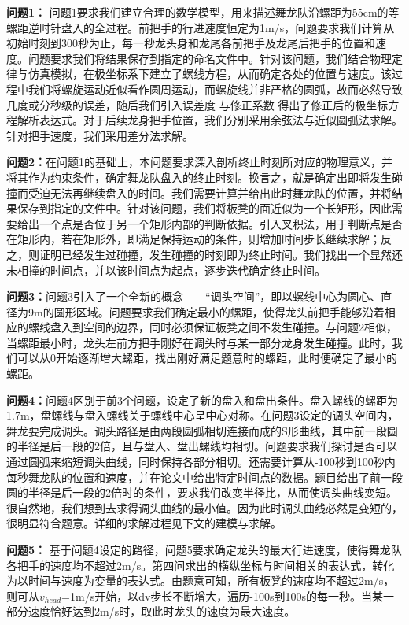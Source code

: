 \documentclass{cumcmthesis1}
\begin{document}
\par 
\textbf{问题1：} 问题1要求我们建立合理的数学模型，用来描述舞龙队沿螺距为55cm的等螺距逆时针盘入的全过程。前把手的行进速度恒定为1m/s，问题要求我们计算从初始时刻到300秒为止，每一秒龙头身和龙尾各前把手及龙尾后把手的位置和速度。问题要求我们将结果保存到指定的命名文件中。针对该问题，我们结合物理定律与仿真模拟，在极坐标系下建立了螺线方程，从而确定各处的位置与速度。该过程中我们将螺旋运动近似看作圆周运动，而螺旋线并非严格的圆弧，故而必然导致几度或分秒级的误差，随后我们引入误差度 \text{$\eta$}与修正系数 \text{$\alpha$}得出了修正后的极坐标方程解析表达式。对于后续龙身把手位置，我们分别采用余弦法与近似圆弧法求解。针对把手速度，我们采用差分法求解。
\par
\textbf{问题2：}在问题1的基础上，本问题要求深入剖析终止时刻所对应的物理意义，并将其作为约束条件，确定舞龙队盘入的终止时刻。换言之，就是确定出即将发生碰撞而受迫无法再继续盘入的时间。我们需要计算并给出此时舞龙队的位置，并将结果保存到指定的文件中。针对该问题，我们将板凳的面近似为一个长矩形，因此需要给出一个点是否位于另一个矩形内部的判断依据。引入叉积法，用于判断点是否在矩形内，若在矩形外，即满足保持运动的条件，则增加时间步长继续求解；反之，则证明已经发生过碰撞，发生碰撞的时刻即为终止时间。我们找出一个显然还未相撞的时间点，并以该时间点为起点，逐步迭代确定终止时间。
\par
\textbf{问题3：}问题3引入了一个全新的概念——“调头空间”，即以螺线中心为圆心、直径为9m的圆形区域。问题要求我们确定最小的螺距，使得龙头前把手能够沿着相应的螺线盘入到空间的边界，同时必须保证板凳之间不发生碰撞。与问题2相似，当螺距最小时，龙头左前方把手刚好在调头时与某一部分龙身发生碰撞。此时，我们可以从0开始逐渐增大螺距，找出刚好满足题意时的螺距，此时便确定了最小的螺距。
\par
\textbf{问题4：}问题4区别于前3个问题，设定了新的盘入和盘出条件。盘入螺线的螺距为1.7m，盘螺线与盘入螺线关于螺线中心呈中心对称。在问题3设定的调头空间内，舞龙要完成调头。调头路径是由两段圆弧相切连接而成的S形曲线，其中前一段圆的半径是后一段的2倍，且与盘入、盘出螺线均相切。问题要求我们探讨是否可以通过圆弧来缩短调头曲线，同时保持各部分相切。还需要计算从-100秒到100秒内每秒舞龙队的位置和速度，并在论文中给出特定时间点的数据。题目给出了前一段圆的半径是后一段的2倍时的条件，要求我们改变半径比，从而使调头曲线变短。很自然地，我们想到去求得调头曲线的最小值。因为此时调头曲线必然是变短的，很明显符合题意。详细的求解过程见下文的建模与求解。
\par
\textbf{问题5：} 基于问题4设定的路径，问题5要求确定龙头的最大行进速度，使得舞龙队各把手的速度均不超过2m/s。第四问求出的横纵坐标与时间相关的表达式，转化为以时间与速度为变量的表达式。由题意可知，所有板凳的速度均不超过2m/s，则可从$v_{head}$=1m/s开始，以dv步长不断增大，遍历-100s到100s的每一秒。当某一部分速度恰好达到2m/s时，取此时龙头的速度为最大速度。
\end{document}
